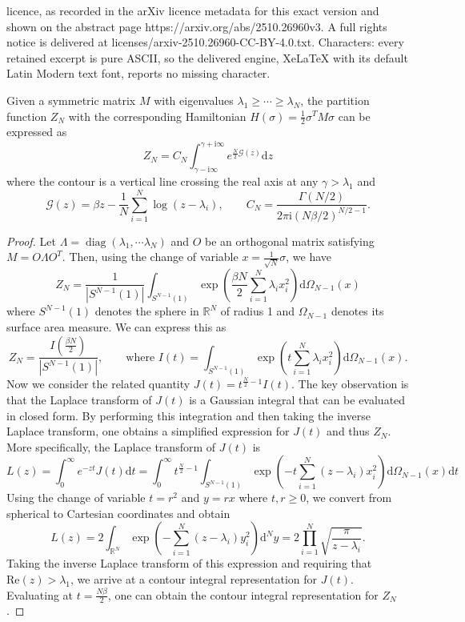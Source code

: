 \documentclass[10pt,a4paper]{amsart}
\DeclareMathOperator*{\diag}{diag}
\def \RR {\mathbb{R}}
\def \b {\beta}
\def \cG {\mathcal{G}}
\def \dd {\mathrm{d}}
\def \g {\gamma}
\def \la {\lambda}
\def \s {\sigma}
\newcommand{\beq}{ \begin{equation} }
\newcommand{\eeq}{ \end{equation} }
\newcommand{\ii}{\mathrm{i}}
\begin{document}
licence, as recorded in the arXiv licence metadata for this exact version and shown on the abstract page https://arxiv.org/abs/2510.26960v3. A full rights notice is delivered at licenses/arxiv-2510.26960-CC-BY-4.0.txt. Characters: every retained excerpt is pure ASCII, so the delivered engine, XeLaTeX with its default Latin Modern text font, reports no missing character.
\begin{lemma}\label{lem:contourintegral} Given a symmetric matrix $M$ with eigenvalues $\la_1\geq\cdots\geq\la_N$, the partition function $Z_N$ with the corresponding Hamiltonian $H(\s) =\frac12\s^TM\s$ can be expressed as
\beq
Z_N=C_N\int_{\g-\ii\infty}^{\g+\ii\infty}e^{\frac{N}{2}\cG(z)}\dd z
\eeq
where the contour is a vertical line crossing the real axis at any $\g>\la_1$ and
\beq
\cG(z)=\b z-\frac1N\sum_{i=1}^N\log(z-\la_i),\qquad C_N=\frac{\Gamma(N/2)}{2\pi\ii(N\b/2)^{N/2-1}}.
\eeq
\end{lemma}

\begin{proof}
Let $\Lambda=\diag(\la_1,\cdots\la_N)$ and $O$ be an orthogonal matrix satisfying $M=O\Lambda O^T$.  Then, using the change of variable $x=\frac{1}{\sqrt{N}}\sigma$, we have
\beq
Z_N=\frac{1}{|S^{N-1}(1)|}\int_{S^{N-1}(1)}\exp\left(\frac{\b N}{2}\sum_{i=1}^N\la_i x_i^2\right)\dd\Omega_{N-1}(x)
\eeq
where $S^{N-1}(1)$ denotes the sphere in $\RR^N$ of radius 1 and $\Omega_{N-1}$ denotes its surface area measure.  We can express this as
\beq
Z_N=\frac{I(\frac{\b N}{2})}{|S^{N-1}(1)|},\qquad\text{where }I(t)=\int_{S^{N-1}(1)}\exp\left(t\sum_{i=1}^N\la_i x_i^2\right)\dd\Omega_{N-1}(x).
\eeq
Now we consider the related quantity $J(t)=t^{\frac{N}{2}-1}I(t)$.  The key observation is that the Laplace transform of $J(t)$ is a Gaussian integral that can be evaluated in closed form.  By performing this integration and then taking the inverse Laplace transform, one obtains a simplified expression for $J(t)$ and thus $Z_N$.  More specifically, the Laplace transform of $J(t)$ is
\beq
L(z)=\int_0^\infty e^{-zt}J(t)\dd t=\int_0^\infty t^{\frac{N}{2}-1}\int_{S^{N-1}(1)}\exp\left(-t\sum_{i=1}^N(z-\la_i)x_i^2\right)\dd\Omega_{N-1}(x)\dd t
\eeq
Using the change of variable $t=r^2$ and $y=rx$ where $t,r\geq 0$, we convert from spherical to Cartesian coordinates and obtain
\beq
L(z)=2\int_{\RR^N}\exp\left(-\sum_{i=1}^N(z-\la_i)y_i^2\right)\dd^Ny=2\prod_{i=1}^N\sqrt{\frac{\pi}{z-\la_i}}.
\eeq
Taking the inverse Laplace transform of this expression and requiring that $\mathrm{Re} (z) >\la_1$, we arrive at a contour integral representation for $J(t)$.  Evaluating at $t=\frac{N\b}{2}$, one can obtain the contour integral representation for $Z_N$.
\end{proof}
\end{document}
